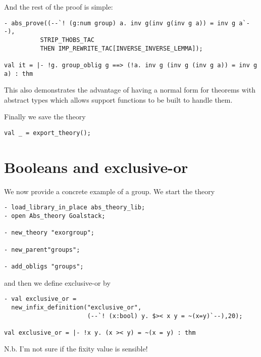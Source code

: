 And the rest of the proof is simple:

\begin{small}
\begin{verbatim}       
- abs_prove((--`! (g:num group) a. inv g(inv g(inv g a)) = inv g a`--),
          STRIP_THOBS_TAC
          THEN IMP_REWRITE_TAC[INVERSE_INVERSE_LEMMA]);

val it = |- !g. group_oblig g ==> (!a. inv g (inv g (inv g a)) = inv g a) : thm
\end{verbatim}
\end{small}

This also demonstrates the advantage of having a normal form for theorems
with abstract types which allows support functions to be built to handle them.

Finally we save the theory

\begin{small}
\begin{verbatim}
val _ = export_theory();
\end{verbatim}
\end{small}

\section{Booleans and exclusive-or}

We now provide a concrete example of a group. We start the theory

\begin{small}
\begin{verbatim}
- load_library_in_place abs_theory_lib;
- open Abs_theory Goalstack;
    
- new_theory "exorgroup";

- new_parent"groups";

- add_obligs "groups";
\end{verbatim}
\end{small}

and then we define exclusive-or by

\begin{small}
\begin{verbatim}
- val exclusive_or =
  new_infix_definition("exclusive_or",
                       (--`! (x:bool) y. $>< x y = ~(x=y)`--),20);

val exclusive_or = |- !x y. (x >< y) = ~(x = y) : thm
\end{verbatim}
\end{small}

N.b. I'm not sure if the fixity value is sensible!

